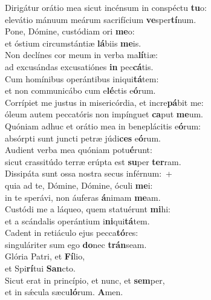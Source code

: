\evenverse Dirigátur orátio mea sicut incénsum in conspéctu \textbf{tu}o:~\*\\
\evenverse elevátio mánuum meárum sacrifícium \textbf{ve}sper\textbf{tí}num.\\
\oddverse Pone, Dómine, custódiam ori \textbf{me}o:~\*\\
\oddverse et óstium circumstántiæ \textbf{lá}biis \textbf{me}is.\\
\evenverse Non declínes cor meum in verba ma\textbf{lí}tiæ:~\*\\
\evenverse ad excusándas excusatiónes \textbf{in} pec\textbf{cá}tis.\\
\oddverse Cum homínibus operántibus iniqui\textbf{tá}tem:~\*\\
\oddverse et non communicábo cum e\textbf{lé}ctis e\textbf{ó}rum.\\
\evenverse Corrípiet me justus in misericórdia, et incre\textbf{pá}bit me:~\*\\
\evenverse óleum autem peccatóris non impínguet \textbf{ca}put \textbf{me}um.\\
\oddverse Quóniam adhuc et orátio mea in beneplácitis e\textbf{ó}rum:~\*\\
\oddverse absórpti sunt juncti petræ júdi\textbf{ces} e\textbf{ó}rum.\\
\evenverse Audient verba mea quóniam potu\textbf{é}runt:~\*\\
\evenverse sicut crassitúdo terræ erúpta est \textbf{su}per \textbf{ter}ram.\\
\oddverse Dissipáta sunt ossa nostra secus inférnum:~+\\
\oddverse  quia ad te, Dómine, Dómine, óculi \textbf{me}i:~\*\\
\oddverse in te sperávi, non áuferas \textbf{á}nimam \textbf{me}am.\\
\evenverse Custódi me a láqueo, quem statuérunt \textbf{mi}hi:~\*\\
\evenverse et a scándalis operántium i\textbf{ni}qui\textbf{tá}tem.\\
\oddverse Cadent in retiáculo ejus pecca\textbf{tó}res:~\*\\
\oddverse singuláriter sum ego \textbf{do}nec \textbf{trán}seam.\\
\evenverse Glória Patri, et \textbf{Fí}lio,~\*\\
\evenverse et Spi\textbf{rí}tui \textbf{San}cto.\\
\oddverse Sicut erat in princípio, et nunc, et \textbf{sem}per,~\*\\
\oddverse et in sǽcula sæcu\textbf{ló}rum. \textbf{A}men.\\
